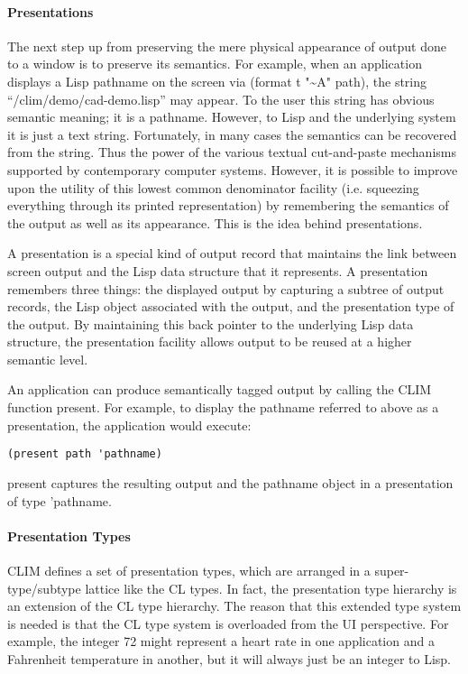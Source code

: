\documentclass[twocolumn,a4paper]{article}
\newcommand {\code}[1]{{\sffamily #1}}
\newcommand {\CLIM}{{\small CLIM}}
\let\method\code
\begin{document}
\paragraph*{Presentations} The next step up from preserving the mere
physical appearance of output done to a window is to preserve its
semantics. For example, when an application displays a Lisp pathname
on the screen via \code{(format t "\~{}A" path)}, the string
``/clim/demo/cad-demo.lisp'' may appear. To the user this string has
obvious semantic meaning; it is a pathname. However, to Lisp and the
underlying system it is just a text string. Fortunately, in many cases
the semantics can be recovered from the string. Thus the power of the
various textual cut-and-paste mechanisms supported by contemporary
computer systems. However, it is possible to improve upon the utility
of this lowest common denominator facility (i.e. squeezing everything
through its printed representation) by remembering the semantics of
the output as well as its appearance. This is the idea behind
presentations.

A presentation is a special kind of output record that maintains the
link between screen output and the Lisp data structure that it
represents. A presentation remembers three things: the displayed
output by capturing a subtree of output records, the Lisp object
associated with the output, and the presentation type of the output.
By maintaining this back pointer to the underlying Lisp data
structure, the presentation facility allows output to be reused at a
higher semantic level.

An application can produce semantically tagged output by calling the
\CLIM{} function \method{present}. For example, to display the
pathname referred to above as a presentation, the application would
execute:
\begin{lstlisting}
(present path 'pathname)
\end{lstlisting}
\method{present} captures the resulting output and the pathname object
in a presentation of type \code{'pathname}.

\paragraph*{Presentation Types} \CLIM{} defines a set of presentation
types, which are arranged in a super-type/subtype lattice like the CL
types. In fact, the presentation type hierarchy is an extension of the
CL type hierarchy. The reason that this extended type system is needed
is that the CL type system is overloaded from the UI perspective. For
example, the integer 72 might represent a heart rate in one
application and a Fahrenheit temperature in another, but it will
always just be an integer to Lisp.
\end{document}
